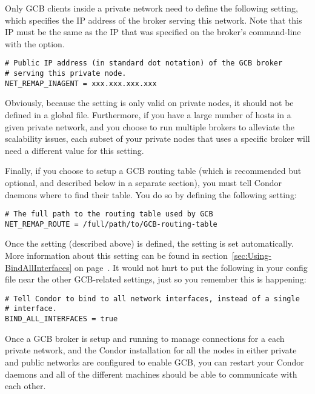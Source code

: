Only GCB clients inside a private network need to define the following
setting, which specifies the IP address of the broker serving this
network.
Note that this IP must be the same as the IP that was specified on the
broker's command-line with the  option.

\footnotesize
\begin{verbatim}
# Public IP address (in standard dot notation) of the GCB broker
# serving this private node.
NET_REMAP_INAGENT = xxx.xxx.xxx.xxx
\end{verbatim}
\normalsize

Obviously, because the  setting is only
valid on private nodes, it should not be defined in a global
 file.
Furthermore, if you have a large number of hosts in a given private
network, and you choose to run multiple brokers to alleviate the
scalability issues, each subset of your private nodes that uses a
specific broker will need a different value for this setting.

Finally, if you choose to setup a GCB routing table (which is
recommended but optional, and described below in a separate section),
you must tell Condor daemons where to find their table.
You do so by defining the following setting:

\footnotesize
\begin{verbatim}
# The full path to the routing table used by GCB
NET_REMAP_ROUTE = /full/path/to/GCB-routing-table
\end{verbatim}
\normalsize

Once the  setting (described above) is
defined, the  setting is set
automatically.
More information about this setting can be found in
section~\ref{sec:Using-BindAllInterfaces} on
page~\pageref{sec:Using-BindAllInterfaces}.
It would not hurt to put the following in your config file near the
other GCB-related settings, just so you remember this is happening:

\footnotesize
\begin{verbatim}
# Tell Condor to bind to all network interfaces, instead of a single
# interface.
BIND_ALL_INTERFACES = true
\end{verbatim}
\normalsize

Once a GCB broker is setup and running to manage connections for a
each private network, and the Condor installation for all the nodes in
either private and public networks are configured to enable GCB, you
can restart your Condor daemons and all of the different machines
should be able to communicate with each other.


